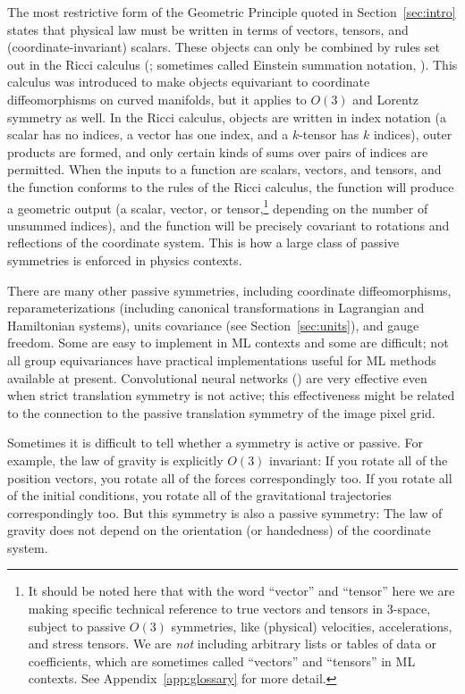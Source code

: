 \documentclass[accepted]{article}
\newcommand{\sectionname}{Section}
\newcommand{\secref}[1]{\sectionname~\ref{#1}}
\newcommand{\appref}[1]{Appendix~\ref{#1}}
\begin{document}
The most restrictive form of the Geometric Principle quoted in \secref{sec:intro} states that physical law must be written in terms of vectors, tensors, and (coordinate-invariant) scalars.
These objects can only be combined by rules set out in the Ricci calculus (\citealt{ricci}; sometimes called Einstein summation notation, \citealt{einstein}).
This calculus was introduced to make objects equivariant to coordinate diffeomorphisms on curved manifolds, but it applies to $O(3)$ and Lorentz symmetry as well.
In the Ricci calculus, objects are written in index notation (a scalar has no indices, a vector has one index, and a $k$-tensor has $k$ indices), outer products are formed, and only certain kinds of sums over pairs of indices are permitted.
When the inputs to a function are scalars, vectors, and tensors, and the function conforms to the rules of the Ricci calculus, the function will produce a geometric output (a scalar, vector, or tensor,\footnote{%
It should be noted here that with the word ``vector'' and ``tensor'' here we are making specific technical reference to true vectors and tensors in 3-space, subject to passive $O(3)$ symmetries, like (physical) velocities, accelerations, and stress tensors.
We are \emph{not} including arbitrary lists or tables of data or coefficients, which are sometimes called ``vectors'' and ``tensors'' in ML contexts. See \appref{app:glossary} for more detail.} depending on the number of unsummed indices), and the function will be precisely covariant to rotations and reflections of the coordinate system.
This is how a large class of passive symmetries is enforced in physics contexts.

There are many other passive symmetries, including coordinate diffeomorphisms, reparameterizations (including canonical transformations in Lagrangian and Hamiltonian systems), units covariance (see \secref{sec:units}), and gauge freedom.
Some are easy to implement in ML contexts and some are difficult;
not all group equivariances have practical implementations useful for ML methods available at present.
Convolutional neural networks (\citealt{lecun1989backpropagation}) are very effective even when strict translation symmetry is not active; this effectiveness might be related to the connection to the passive translation symmetry of the image pixel grid.

Sometimes it is difficult to tell whether a symmetry is active or passive.
For example, the law of gravity is explicitly $O(3)$ invariant:
If you rotate all of the position vectors, you rotate all of the forces correspondingly too.
If you rotate all of the initial conditions, you rotate all of the gravitational trajectories correspondingly too.
But this symmetry is also a passive symmetry:
The law of gravity does not depend on the orientation (or handedness) of the coordinate system.
\end{document}

